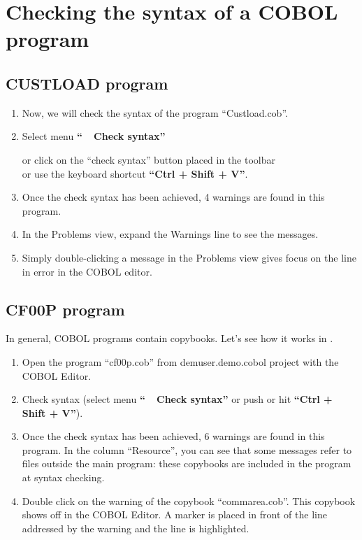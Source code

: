 
\chapter{Checking the syntax of a COBOL program}

\section{CUSTLOAD program}

\begin{enumerate}
\item Now, we will check the syntax of the program ``Custload.cob''.

\item Select menu \textbf{``\mxproduct~\RHD~Check syntax''}
\\ \parbox{8cm}{or click on the ``check syntax'' button placed in the toolbar \\or use the keyboard shortcut \textbf{``Ctrl + Shift + V''}.}

\item Once the check syntax has been achieved, 4 warnings are found in this program.

\item In the Problems view, expand the Warnings line to see the messages.

\item Simply double-clicking a message in the Problems view gives focus on the line in error in the COBOL editor.
\end{enumerate}


\section{CF00P program}

In general, COBOL programs contain copybooks. Let's see how it works in \mxproduct.

\begin{enumerate}
\item Open the program ``cf00p.cob'' from demuser.demo.cobol project with the COBOL Editor.

\item Check syntax (select menu \textbf{``\mxproduct~\RHD~Check syntax''} or push  or hit \textbf{``Ctrl + Shift + V''}).

\item Once the check syntax has been achieved, 6 warnings are found in this program.
In the column ``Resource'', you can see that some messages refer to files outside the main program: these copybooks are included in the program at syntax checking.

\item Double click on the warning of the copybook ``commarea.cob''. This copybook shows off in the COBOL Editor.
A marker is placed in front of the line addressed by the warning and the line is highlighted.
\end{enumerate}
